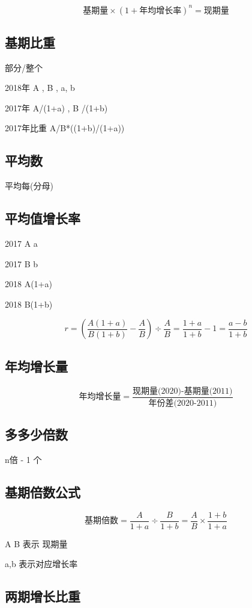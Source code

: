 \documentclass[UTF8]{ctexart}
\begin{document}
$$
	\mbox{基期量} \times (1+\mbox{年均增长率})^n = \mbox{现期量}
$$


\subsection{基期比重}
部分/整个

2018年 A , B , a, b

2017年 A/(1+a) , B /(1+b)

2017年比重 A/B*((1+b)/(1+a))

\subsection{平均数}

平均每(分母)


\subsection{平均值增长率}
2017 A a

2017 B b

2018 A(1+a)

2018 B(1+b)

$$
	r = (\frac{A(1+a)}{B(1+b)} - \frac{A}{B}) \div \frac{A}{B} = \frac{1+a}{1+b} - 1 = \frac{a - b}{1+b}
$$

\subsection{年均增长量}

$$
	\mbox{年均增长量} = \frac{\mbox{现期量(2020)-基期量(2011)}}{\mbox{年份差(2020-2011)}}
$$


\subsection{多多少倍数}

n倍 - 1 个


\subsection{基期倍数公式}

$$
	基期倍数 = \frac{A}{1+a} \div \frac{B}{1+b} = \frac{A}{B} \times \frac{1+b}{1+a}
$$

A B 表示 现期量

a,b 表示对应增长率

\subsection{两期增长比重}
\end{document}

